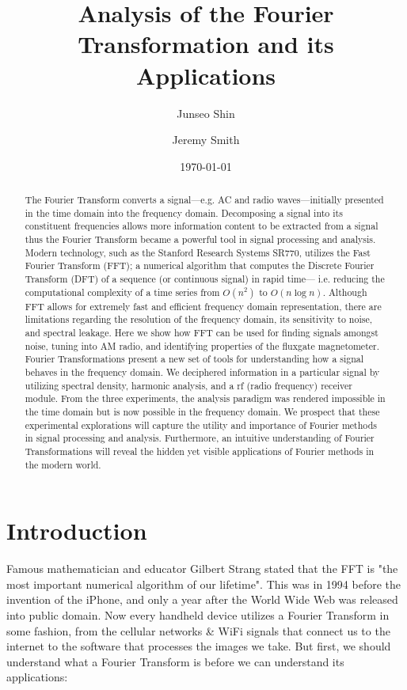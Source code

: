 \documentclass[prl,twocolumn,superscriptaddress,floatfix]{revtex4}
\begin{document}
\title{Analysis of the Fourier Transformation and its Applications}
\author{Junseo Shin}
\author{Jeremy Smith}

\date{\today}

\begin{abstract}
The Fourier Transform converts a signal---e.g. AC and radio waves---initially presented in the time domain into the frequency domain.
Decomposing a signal into its constituent frequencies allows more information content to be extracted from a signal 
thus the Fourier Transform became a powerful tool in signal processing and analysis.
Modern technology, such as the Stanford Research Systems SR770, utilizes the Fast Fourier Transform (FFT);
a numerical algorithm that computes the Discrete Fourier Transform (DFT) of a sequence (or continuous signal) in rapid time--- i.e. reducing the computational complexity of a time series from $O(n^2)$ to $O(n \log n)$\cite{FFT}.
Although FFT allows for extremely fast and efficient frequency domain representation, there are limitations regarding the resolution of the frequency domain,
its sensitivity to noise, and spectral leakage. 
Here we show how FFT can be used for finding signals amongst noise, tuning into AM radio, and identifying properties of the fluxgate magnetometer. 
Fourier Transformations present a new set of tools for understanding how a signal behaves in the frequency domain.
We deciphered information in a particular signal by utilizing spectral density, harmonic analysis, and a rf (radio frequency) receiver module. 
From the three experiments, the analysis paradigm was rendered impossible in the time domain but is now possible in the frequency domain.
We prospect that these experimental explorations will capture the utility and importance of Fourier methods in signal processing and analysis.
Furthermore, an intuitive understanding of Fourier Transformations will reveal the hidden yet visible applications of Fourier methods in the modern world. 
\end{abstract}
\maketitle

\section{Introduction}
Famous mathematician and educator Gilbert Strang stated that the FFT is "the most important numerical algorithm of our lifetime"\cite{strang}.
This was in 1994 before the invention of the iPhone, and only a year after the World Wide Web was released into public domain\cite{cernweb}.
Now every handheld device utilizes a Fourier Transform in some fashion, from the cellular networks \& WiFi signals that connect us to the internet to the software that processes the images we take. But first, we should understand what a Fourier Transform is before we can understand its applications:
\end{document}
